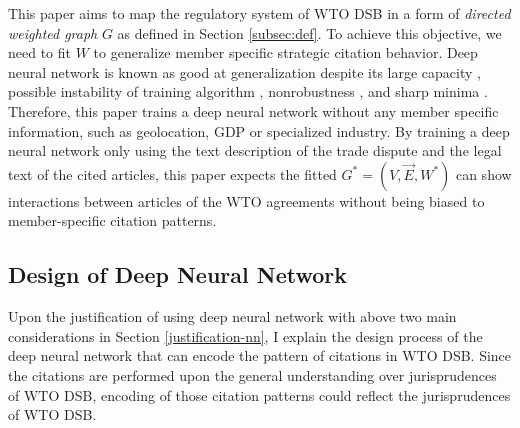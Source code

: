 \documentclass[12pt,letterpaper]{article}
\begin{document}
This paper aims to map the regulatory system of WTO DSB in a form of \textit{directed weighted graph} $G$ as defined in Section \ref{subsec:def}.
To achieve this objective, we need to fit $W$ to generalize member specific strategic citation behavior.
Deep neural network is known as good at generalization despite
its large capacity \citep{neyshabur2017exploring}, possible instability of training algorithm \citep{charles2017stability}, nonrobustness \citep{zahavy2017ensemble}, and sharp minima \citep{dinh2017sharp}.
Therefore, this paper trains a deep neural network without any member specific information, such as geolocation, GDP or specialized industry. %
By training a deep neural network only using the text description of the trade dispute and the legal text of the cited articles,
this paper expects the fitted $G^{*} = (V, \vec{E}, W^*)$ can show interactions between articles of the WTO agreements
without being biased to member-specific citation patterns.

\subsection{Design of Deep Neural Network}\label{subsec:design:dnn}
Upon the justification of using deep neural network with above two main considerations in Section \ref{justification-nn}, %
I explain the design process of the deep neural network that can encode the pattern of citations in WTO DSB.
Since the citations are performed upon the general understanding over jurisprudences of WTO DSB, encoding of
those citation patterns could reflect the jurisprudences of WTO DSB.
 


\end{document}
